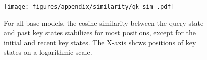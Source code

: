 \begin{figure}[ht]
    \centering
    \texttt{[image: figures/appendix/similarity/qk\_sim\_.pdf]}
    \caption{For all base models, the cosine similarity between the query state and past key states stabilizes for most positions, except for the initial and recent key states. The X-axis shows positions of key states on a logarithmic scale.} 
    \label{fig:app:sim:qk}
\end{figure}